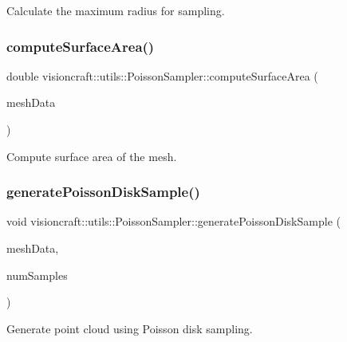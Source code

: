 Calculate the maximum radius for sampling. 

\mbox{\label{classvisioncraft_1_1utils_1_1PoissonSampler_a483e265853d48adab5ead1ce355caa7c}} 
\subsubsection{\texorpdfstring{compute\+Surface\+Area()}{computeSurfaceArea()}}
{\footnotesize\ttfamily double visioncraft\+::utils\+::\+Poisson\+Sampler\+::compute\+Surface\+Area (\begin{DoxyParamCaption}\item[{const vtk\+Smart\+Pointer$<$ vtk\+Poly\+Data $>$ \&}]{mesh\+Data }\end{DoxyParamCaption})}



Compute surface area of the mesh. 

\mbox{\label{classvisioncraft_1_1utils_1_1PoissonSampler_a1a888b0e8d5664c138a99f8f1c3ab4f7}} 
\subsubsection{\texorpdfstring{generate\+Poisson\+Disk\+Sample()}{generatePoissonDiskSample()}}
{\footnotesize\ttfamily void visioncraft\+::utils\+::\+Poisson\+Sampler\+::generate\+Poisson\+Disk\+Sample (\begin{DoxyParamCaption}\item[{const vtk\+Smart\+Pointer$<$ vtk\+Poly\+Data $>$ \&}]{mesh\+Data,  }\item[{int}]{num\+Samples }\end{DoxyParamCaption})}



Generate point cloud using Poisson disk sampling. 

